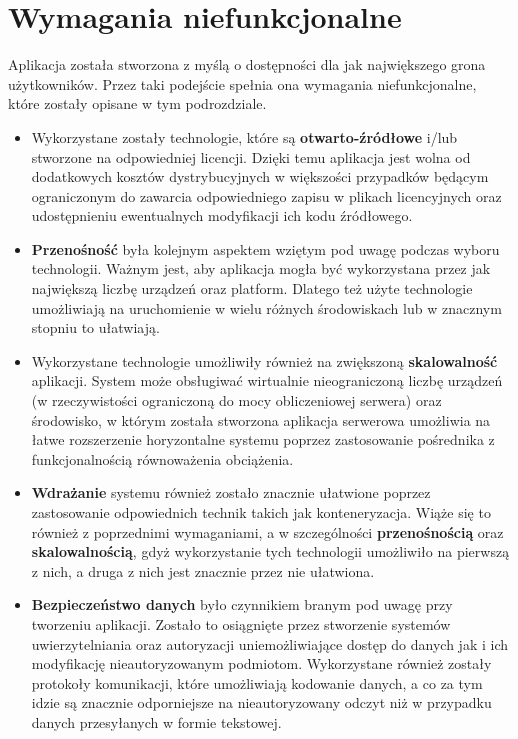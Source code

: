 \section{Wymagania niefunkcjonalne}
Aplikacja została stworzona z myślą o dostępności dla jak największego grona użytkowników.
Przez taki podejście spełnia ona wymagania niefunkcjonalne, które zostały opisane w tym podrozdziale.
\begin{itemize}
  \item Wykorzystane zostały technologie, które są \textbf{otwarto-źródłowe} i/lub stworzone na odpowiedniej
    licencji. Dzięki temu aplikacja jest wolna od dodatkowych kosztów dystrybucyjnych w większości
    przypadków będącym ograniczonym do zawarcia odpowiedniego zapisu w plikach licencyjnych oraz
    udostępnieniu ewentualnych modyfikacji ich kodu źródłowego.
  \item \textbf{Przenośność} była kolejnym aspektem wziętym pod uwagę podczas wyboru technologii. Ważnym jest,
    aby aplikacja mogła być wykorzystana przez jak największą liczbę urządzeń oraz platform. Dlatego też
    użyte technologie umożliwiają na uruchomienie w wielu różnych środowiskach lub w znacznym stopniu to ułatwiają.
  \item Wykorzystane technologie umożliwiły również na zwiększoną \textbf{skalowalność} aplikacji. System może
    obsługiwać wirtualnie nieograniczoną liczbę urządzeń (w rzeczywistości ograniczoną do mocy obliczeniowej serwera)
    oraz środowisko, w którym została stworzona aplikacja serwerowa umożliwia na łatwe rozszerzenie horyzontalne
    systemu poprzez zastosowanie pośrednika z funkcjonalnością równoważenia obciążenia.
  \item \textbf{Wdrażanie} systemu również zostało znacznie ułatwione poprzez zastosowanie odpowiednich
    technik takich jak konteneryzacja. Wiąże się to również z poprzednimi wymaganiami, a w szczególności
    \textbf{przenośnością} oraz \textbf{skalowalnością}, gdyż wykorzystanie tych technologii umożliwiło
    na pierwszą z nich, a druga z nich jest znacznie przez nie ułatwiona.
  \item \textbf{Bezpieczeństwo danych} było czynnikiem branym pod uwagę przy tworzeniu aplikacji. 
    Zostało to osiągnięte przez stworzenie systemów uwierzytelniania oraz autoryzacji uniemożliwiające
    dostęp do danych jak i ich modyfikację nieautoryzowanym podmiotom. Wykorzystane również zostały
    protokoły komunikacji, które umożliwiają kodowanie danych, a co za tym idzie są znacznie odporniejsze
    na nieautoryzowany odczyt niż w przypadku danych przesyłanych w formie tekstowej.
\end{itemize}


